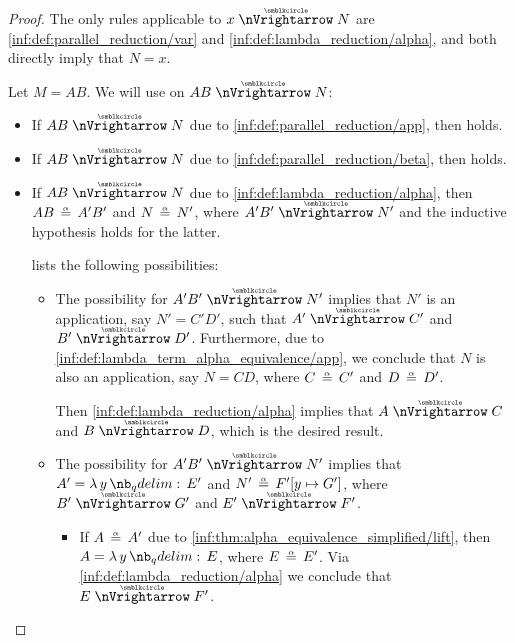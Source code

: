 \begin{proof}
   The only rules applicable to \( x \ppred N \) are \ref{inf:def:parallel_reduction/var} and \ref{inf:def:lambda_reduction/alpha}, and both directly imply that \( N = x \).

   Let \( M = AB \). We will use  on \( AB \ppred N \):
  \begin{itemize}
    \item If \( AB \ppred N \) due to \ref{inf:def:parallel_reduction/app}, then  holds.

    \item If \( AB \ppred N \) due to \ref{inf:def:parallel_reduction/beta}, then  holds.

    \item If \( AB \ppred N \) due to \ref{inf:def:lambda_reduction/alpha}, then \( AB \aequiv A' B' \) and \( N \aequiv N' \), where \( A' B' \ppred N' \) and the inductive hypothesis holds for the latter.

     lists the following possibilities:
    \begin{itemize}
      \item The possibility  for \( A' B' \ppred N' \) implies that \( N' \) is an application, say \( N' = C' D' \), such that \( A' \ppred C' \) and \( B' \ppred D' \). Furthermore, due to \ref{inf:def:lambda_term_alpha_equivalence/app}, we conclude that \( N \) is also an application, say \( N = CD \), where \( C \aequiv C' \) and \( D \aequiv D' \).

      Then \ref{inf:def:lambda_reduction/alpha} implies that \( A \ppred C \) and \( B \ppred D \), which is the desired result.

      \item The possibility  for \( A' B' \ppred N' \) implies that \( A' = \qabs y E' \) and \( N' \aequiv F'[y \mapsto G'] \), where \( B' \ppred G' \) and \( E' \ppred F' \).

      \begin{itemize}
        \item If \( A \aequiv A' \) due to \ref{inf:thm:alpha_equivalence_simplified/lift}, then \( A = \qabs y E \), where \( E \aequiv E' \). Via \ref{inf:def:lambda_reduction/alpha} we conclude that \( E \ppred F' \).


\end{itemize}
\end{itemize}
\end{itemize}
\end{proof}

